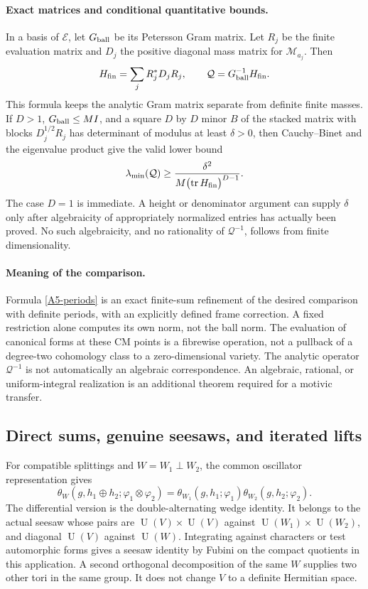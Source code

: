 \documentclass[11pt]{article}
\newcommand{\U}{\operatorname{U}}
\begin{document}
\paragraph{Exact matrices and conditional quantitative bounds.}
In a basis of $\mathcal E$, let $G_{\rm ball}$ be its Petersson Gram
matrix. Let $R_j$ be the finite evaluation matrix and $D_j$ the
positive diagonal mass matrix for $\mathcal M_{a_j}$. Then
\[
 H_{\rm fin}=\sum_jR_j^*D_jR_j,\qquad
                  \mathcal Q=G_{\rm ball}^{-1}H_{\rm fin}.
\]
This formula keeps the analytic Gram matrix separate from definite
finite masses. If $D>1$, $G_{\rm ball}\leq M I$, and a square
$D$ by $D$ minor $B$ of the stacked matrix with blocks
$D_j^{1/2}R_j$ has determinant of modulus at least $\delta>0$, then
Cauchy--Binet and the eigenvalue product give the valid lower bound
\[
 \lambda_{\min}(\mathcal Q)
 \geq\frac{\delta^2}{M\bigl(\operatorname{tr}H_{\rm fin}\bigr)^{D-1}}.
\]
The case $D=1$ is immediate. A height or denominator argument can
supply $\delta$ only after algebraicity of appropriately normalized
entries has actually been proved. No such algebraicity, and no
rationality of $\mathcal Q^{-1}$, follows from finite dimensionality.

\paragraph{Meaning of the comparison.}
Formula \eqref{A5-periods} is an exact finite-sum refinement of the
desired comparison with definite periods, with an explicitly defined
frame correction. A fixed restriction alone computes its own norm,
not the ball norm. The evaluation of canonical forms at these CM
points is a fibrewise operation, not a pullback of a degree-two
cohomology class to a zero-dimensional variety. The analytic operator
$\mathcal Q^{-1}$ is not automatically an algebraic correspondence.
An algebraic, rational, or uniform-integral realization is an
additional theorem required for a motivic transfer.

\subsection{Direct sums, genuine seesaws, and iterated lifts}

For compatible splittings and $W=W_1\perp W_2$, the common oscillator
representation gives
\[
 \theta_W(g,h_1\oplus h_2;\varphi_1\otimes\varphi_2)
 =\theta_{W_1}(g,h_1;\varphi_1)
             \theta_{W_2}(g,h_2;\varphi_2).
\]
The differential version is the double-alternating wedge identity.
It belongs to the actual seesaw whose pairs are
$\U(V)\times\U(V)$ against $\U(W_1)\times\U(W_2)$, and diagonal
$\U(V)$ against $\U(W)$. Integrating against characters or test
automorphic forms gives a seesaw identity by Fubini on the compact
quotients in this application. A second orthogonal decomposition of
the same $W$ supplies two other tori in the same group. It does not
change $V$ to a definite Hermitian space.
\end{document}

